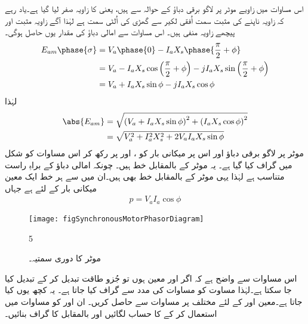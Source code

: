 اس مساوات میں زاویے موٹر پر لاگو برقی دباؤ  کے حوالہ سے ہیں، یعنی   کا زاویہ صفر لیا گیا ہے۔یاد رہے کہ زاویہ ناپنے کی مثبت سمت اُفقی لکیر سے گھڑی کی اُلٹی سمت ہے لہٰذا آگے زاویہ مثبت اور پیچھے زاویہ منفی ہیں۔ اس مساوات سے امالی دباؤ  کی مقدار یوں حاصل ہوگی۔
\begin{align*}
E_{am}\phase{\sigma}&=V_a \phase{0}-I_a X_s \phase{\frac{\pi}{2}+\phi}\\
&=V_a -I_a X_s  \cos \left( \frac{\pi}{2}+\phi\right)- j I_a X_s \sin \left(\frac{\pi}{2}+\phi \right)\\
&=V_a +I_a X_s \sin \phi-j I_a X_s \cos \phi
\end{align*}
لہٰذا
\begin{gather}
\begin{aligned}
\abs{E_{am}}&=\sqrt{\left(V_a +I_a X_s \sin \phi \right)^2+\left(I_a X_s \cos \phi \right)^2}\\
&=\sqrt{V_a^2+I_a^2 X_s^2+ 2 V_a I_a X_s \sin \phi}
\end{aligned}
\end{gather}
موٹر پر لاگو برقی دباؤ اور اس پر میکانی بار کو ،  اور  پر رکھ کر اس مساوات کو شکل    میں  گراف کیا گیا ہے۔ یہ موٹر کے  بالمقابل   خط ہیں۔ چونکہ امالی دباؤ  کے براہِ راست متناسب ہے لہٰذا یہی موٹر کے  بالمقابل  خط بھی ہیں۔ان میں سے ہر خط ایک معین میکانی بار  کے لئے ہے جہاں
\begin{align}
p=V_a I_a \cos \phi
\end{align}
%
\begin{figure}
\centering
\texttt{[image: figSynchronousMotorPhasorDiagram]}
\caption{موٹر کا دوری سمتیہ۔}
\label{شکل_معاصر_موٹر_کی_دوری_سمتیہ}
5\end{figure}
%
اس مساوات سے واضح ہے کہ اگر  اور  معین ہوں تو جُزو طاقت تبدیل کر کے  تبدیل کیا جا سکتا ہے۔لہٰذا مساوت  کو مساوات  کی مدد سے گراف کیا جاتا ہے۔ یہ کچھ یوں کیا جاتا ہے۔معین  اور  کے لئے مختلف  پر مساوات   سے  حاصل کریں۔ ان  اور  کو مساوات  میں استعمال کر کے  کا حساب لگائیں اور  بالمقابل  کا گراف بنائیں۔

